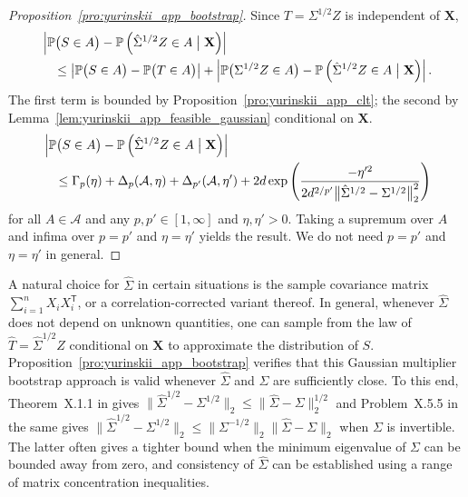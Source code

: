 \documentclass[11pt,lof]{puthesis}
\renewcommand{\P}{\ensuremath{\mathbb{P}}}
\newcommand{\bX}{\ensuremath{\mathbf{X}}}
\newcommand{\cA}{\ensuremath{\mathcal{A}}}
\newcommand{\T}{\ensuremath{\mathsf{T}}}
\theoremstyle{break}
\theoremstyle{proof}
\newtheorem{proof}{Proof}
\begin{document}
\begin{proof}[Proposition~\ref{pro:yurinskii_app_bootstrap}]

  Since $T = \Sigma^{1/2} Z$ is independent of $\bX$,
  \begin{align*}
    &\left|
      \P\big(S \in A\big)
      - \P\left(\hat \Sigma^{1/2} Z \in A \bigm| \bX\right)
    \right| \\
    &\quad\leq
    \left|
      \P\big(S \in A\big)
      - \P\big(T \in A\big)
    \right|
    +\left|
      \P\big(\Sigma^{1/2} Z \in A\big)
      - \P\left(\hat \Sigma^{1/2} Z \in A \bigm| \bX\right)
    \right|.
  \end{align*}
  The first term is bounded by Proposition~\ref{pro:yurinskii_app_clt};
  the second by Lemma~\ref{lem:yurinskii_app_feasible_gaussian}
  conditional on $\bX$.
  \begin{align*}
    &\left|
      \P\big(S \in A\big)
      - \P\left(\hat \Sigma^{1/2} Z \in A \bigm| \bX\right)
    \right| \\
    &\quad\leq
    \Gamma_p(\eta) + \Delta_p(\cA, \eta)
    + \Delta_{p'}(\cA, \eta')
    + 2 d \exp \left( \frac{-\eta'^2}
      {2 d^{2/p'} \big\|\hat\Sigma^{1/2} - \Sigma^{1/2}\big\|_2^2}
    \right)
  \end{align*}
  for all $A \in \cA$
  and any $p, p' \in [1, \infty]$ and $\eta, \eta' > 0$.
  Taking a supremum over $A$ and infima over
  $p = p'$ and $\eta = \eta'$ yields the result.
  We do not need
  $p = p'$ and $\eta = \eta'$ in general.
\end{proof}

A natural choice for $\hat\Sigma$ in certain situations is the sample
covariance matrix $\sum_{i=1}^n X_i X_i^\T$, or a correlation-corrected variant
thereof. In general, whenever $\hat \Sigma$ does not depend on unknown
quantities, one can sample from the law of $\hat T = \hat\Sigma^{1/2} Z$
conditional on $\bX$ to approximate the distribution of $S$.
Proposition~\ref{pro:yurinskii_app_bootstrap} verifies that this Gaussian
multiplier
bootstrap approach is valid whenever $\hat\Sigma$ and $\Sigma$ are sufficiently
close. To this end, Theorem~X.1.1 in \citet{bhatia1997matrix} gives
$\big\|\hat\Sigma^{1/2} - \Sigma^{1/2}\big\|_2
\leq \big\|\hat\Sigma - \Sigma\big\|_2^{1/2}$
and Problem~X.5.5 in the same gives
$\big\|\hat\Sigma^{1/2} - \Sigma^{1/2}\big\|_2
\leq \big\|\Sigma^{-1/2}\big\|_2 \big\|\hat\Sigma - \Sigma\big\|_2$
when $\Sigma$ is invertible. The latter often gives a tighter bound when the
minimum eigenvalue of $\Sigma$ can be bounded away from zero, and consistency
of $\hat \Sigma$ can be established using a range of matrix concentration
inequalities.
\end{document}
